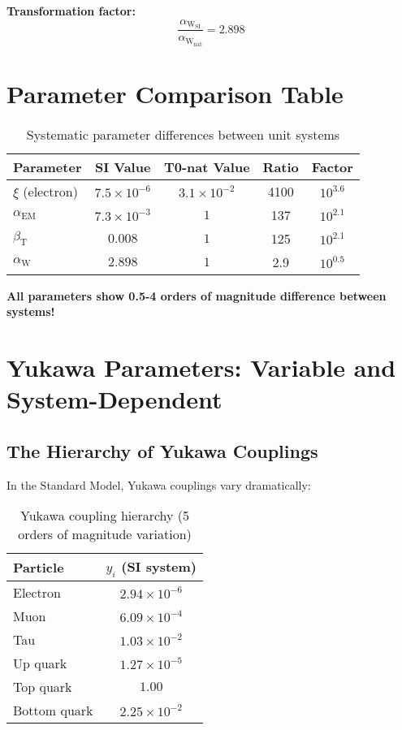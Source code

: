 \documentclass[12pt,a4paper]{article}
\newcommand{\xipar}{\xi}
\newcommand{\alphaEM}{\alpha_{\text{EM}}}
\newcommand{\alphaW}{\alpha_{\text{W}}}
\newcommand{\betaT}{\beta_{\text{T}}}
\begin{document}
	\textbf{Transformation factor:}
	$$\frac{\alphaW_{\text{SI}}}{\alphaW_{\text{nat}}} = 2.898$$
	
	\section{Parameter Comparison Table}
	\label{sec:parameter_comparison}
	
	\begin{table}[htbp]
		\centering
		\begin{tabular}{lcccc}
			\toprule
			\textbf{Parameter} & \textbf{SI Value} & \textbf{T0-nat Value} & \textbf{Ratio} & \textbf{Factor} \\
			\midrule
			$\xipar$ (electron) & $7.5 \times 10^{-6}$ & $3.1 \times 10^{-2}$ & 4100 & $10^{3.6}$ \\
			$\alphaEM$ & $7.3 \times 10^{-3}$ & $1$ & 137 & $10^{2.1}$ \\
			$\betaT$ & $0.008$ & $1$ & 125 & $10^{2.1}$ \\
			$\alphaW$ & $2.898$ & $1$ & 2.9 & $10^{0.5}$ \\
			\bottomrule
		\end{tabular}
		\caption{Systematic parameter differences between unit systems}
		\label{tab:parameter_comparison}
	\end{table}
	
	\textbf{All parameters show 0.5-4 orders of magnitude difference between systems!}
	
	\section{Yukawa Parameters: Variable and System-Dependent}
	\label{sec:yukawa_parameters}
	
	\subsection{The Hierarchy of Yukawa Couplings}
	\label{subsec:yukawa_hierarchy}
	
	In the Standard Model, Yukawa couplings vary dramatically:
	
	\begin{table}[htbp]
		\centering
		\begin{tabular}{lc}
			\toprule
			\textbf{Particle} & \textbf{$y_i$ (SI system)} \\
			\midrule
			Electron & $2.94 \times 10^{-6}$ \\
			Muon & $6.09 \times 10^{-4}$ \\
			Tau & $1.03 \times 10^{-2}$ \\
			Up quark & $1.27 \times 10^{-5}$ \\
			Top quark & $1.00$ \\
			Bottom quark & $2.25 \times 10^{-2}$ \\
			\bottomrule
		\end{tabular}
		\caption{Yukawa coupling hierarchy (5 orders of magnitude variation)}
		\label{tab:yukawa_hierarchy}
	\end{table}
	
\end{document}
